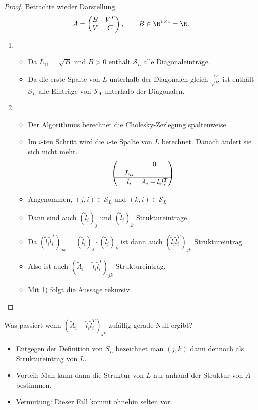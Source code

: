\begin{proof}
Betrachte wieder Darstellung
\begin{equation*}
 A=\begin{pmatrix}
    B & V^T \\
    V & C
\end{pmatrix},
\qquad B \in \R^{1\times 1} = \R.
\end{equation*}
\begin{enumerate}
 \item
  \begin{itemize}
   \item Da $L_{11}=\sqrt{B}$ und $B>0$ enthält $\mathcal{S}_L$ alle Diagonaleinträge.
   \item Da die erste Spalte von $L$ unterhalb der Diagonalen gleich $\frac{V}{\sqrt{B}}$ ist
     enthält $\mathcal{S}_L$ alle Einträge von $\mathcal{S}_A$ unterhalb der Diagonalen.
  \end{itemize}
 \item
   \begin{itemize}
    \item Der Algorithmus berechnet die Cholesky-Zerlegung spaltenweise.
    \item Im $i$-ten Schritt wird die $i$-te Spalte von $L$ berechnet.
       Danach ändert sie sich nicht mehr.
    \begin{equation*}
     \begin{pmatrix}
       & & 0 \\
       \hline
       & L_{ii} & \\
       \hline
       & \tilde{l}_i & \tilde{A}_i - \tilde{l}_i \tilde{l}_i^T
     \end{pmatrix}
    \end{equation*}

    \item Angenommen, $(j,i) \in \mathcal{S}_L$ und $(k,i) \in \mathcal{S}_L$
    \item Dann sind auch $(\tilde{l}_i)_j$ und $(\tilde{l}_i)_k$ Struktureinträge.
    \item Da $(\tilde{l}_i \tilde{l}_i^T)_{jk} = (\tilde{l}_i)_j \cdot (\tilde{l}_i)_k$
     ist dann auch $(\tilde{l}_i \tilde{l}_i^T)_{jk}$ Struktureintrag.
    \item Also ist auch $(\tilde{A}_i-\tilde{l}_i \tilde{l}_i^T)_{jk}$ Struktureintrag.
    \item Mit 1) folgt die Aussage rekursiv. \qedhere
 \end{itemize}
\end{enumerate}
\end{proof}
Was passiert wenn $(\tilde{A}_i - \tilde{l}_i \tilde{l}_i^T)_{jk}$ zufällig gerade
Null ergibt?
\begin{itemize}
 \item Entgegen der Definition von $S_L$ bezeichnet man $(j,k)$ dann dennoch als
  Struktureintrag von $L$.
 \item Vorteil: Man kann dann die Struktur von $L$ nur anhand der Struktur von $A$ bestimmen.
 \item Vermutung: Dieser Fall kommt ohnehin selten vor.
\end{itemize}

